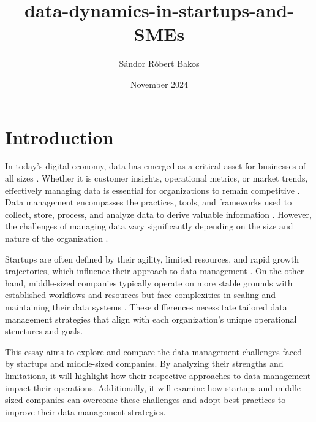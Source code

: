 \documentclass{article}
\title{data-dynamics-in-startups-and-SMEs}
\author{Sándor Róbert Bakos}
\date{November 2024}
\begin{document}
\maketitle

\section*{Introduction} \cite{openai2024chatgpt}

In today’s digital economy, data has emerged as a critical asset for businesses of all sizes \cite{mcafee2012bigdata}. Whether it is customer insights, operational metrics, or market trends, effectively managing data is essential for organizations to remain competitive \cite{redman2013credibility}. Data management encompasses the practices, tools, and frameworks used to collect, store, process, and analyze data to derive valuable information \cite{dama2017dmbook}. However, the challenges of managing data vary significantly depending on the size and nature of the organization \cite{davenport2014bigdata}.

Startups are often defined by their agility, limited resources, and rapid growth trajectories, which influence their approach to data management \cite{ries2011leanstartup}. On the other hand, middle-sized companies typically operate on more stable grounds with established workflows and resources but face complexities in scaling and maintaining their data systems \cite{european2015smedef}. These differences necessitate tailored data management strategies that align with each organization's unique operational structures and goals.

This essay aims to explore and compare the data management challenges faced by startups and middle-sized companies. By analyzing their strengths and limitations, it will highlight how their respective approaches to data management impact their operations. Additionally, it will examine how startups and middle-sized companies can overcome these challenges and adopt best practices to improve their data management strategies.





\end{document}
